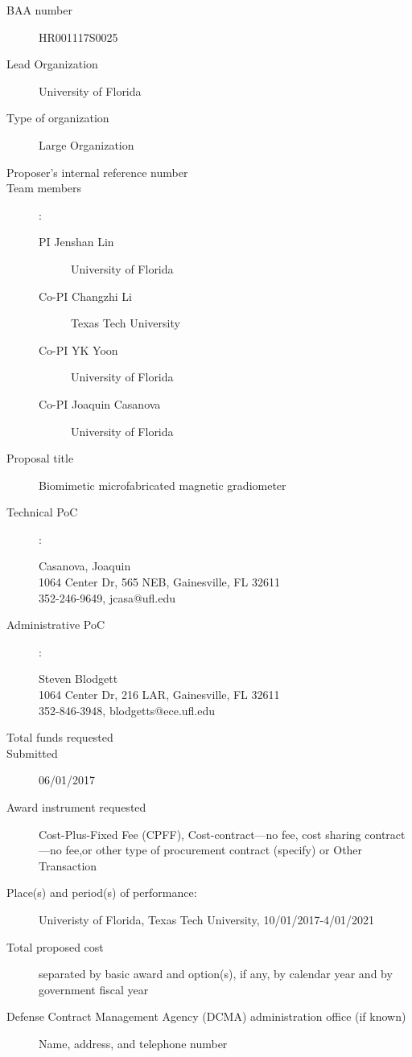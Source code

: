 \begin{description}
\item [BAA number] HR001117S0025
\item [Lead Organization] University of Florida
\item [Type of organization] Large Organization
\item [Proposer’s internal reference number]
\item [Team members]:
  \begin{description}
  \item [PI Jenshan Lin] University of Florida 
  \item [Co-PI Changzhi Li] Texas Tech University
  \item [Co-PI YK Yoon] University of Florida 
  \item [Co-PI Joaquin Casanova] University of Florida 
  \end{description}
\item [Proposal title] Biomimetic microfabricated magnetic gradiometer
\item [Technical PoC]:
  \begin{description}
  \item [Casanova, Joaquin]
  \item [1064 Center Dr, 565 NEB, Gainesville, FL 32611]
  \item [352-246-9649, jcasa@ufl.edu]
  \end{description}
\item [Administrative PoC]:
  \begin{description}
  \item [Steven Blodgett]
  \item [1064 Center Dr, 216 LAR, Gainesville, FL 32611]
  \item [352-846-3948, blodgetts@ece.ufl.edu]
  \end{description}
\item [Total funds requested]
\item [Submitted] 06/01/2017
\item [Award instrument requested] Cost-Plus-Fixed Fee (CPFF), Cost-contract—no fee, cost sharing contract—no fee,or other type of procurement contract (specify) or Other Transaction
\item [Place(s) and period(s) of performance:] Univeristy of Florida, Texas Tech University, 10/01/2017-4/01/2021
\item [Total proposed cost] separated by basic award and option(s), if any, by calendar year
and by government fiscal year
\item [Defense Contract Management Agency (DCMA) administration office (if known)] Name, address, and telephone number

\end{description}
